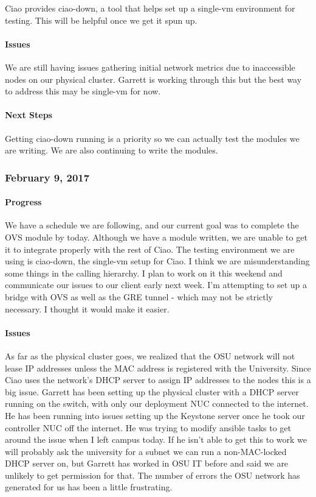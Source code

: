 \documentclass[10pt,onecolumn,journal,draftclsnofoot]{IEEEtran}
\begin{document}
Ciao provides ciao-down, a tool that helps set up a single-vm
environment for testing. This will be helpful once we get it spun up.

\paragraph{Issues} 

We are still having issues gathering initial network metrics due to
inaccessible nodes on our physical cluster. Garrett is working through
this but the best way to address this may be single-vm for now.

\paragraph{Next Steps} 

Getting ciao-down running is a priority so we can actually test the
modules we are writing. We are also continuing to write the modules.

\subsubsection{February 9, 2017} 

\paragraph{Progress} 

We have a schedule we are following, and our current goal was to
complete the OVS module by today. Although we have a module written, we
are unable to get it to integrate properly with the rest of Ciao. The
testing environment we are using is ciao-down, the single-vm setup for
Ciao. I think we are misunderstanding some things in the calling
hierarchy. I plan to work on it this weekend and communicate our issues
to our client early next week. I'm attempting to set up a bridge with
OVS as well as the GRE tunnel - which may not be strictly necessary. I
thought it would make it easier.

\paragraph{Issues} 

As far as the physical cluster goes, we realized that the OSU network
will not lease IP addresses unless the MAC address is registered with
the University. Since Ciao uses the network's DHCP server to assign IP
addresses to the nodes this is a big issue. Garrett has been setting up
the physical cluster with a DHCP server running on the switch, with only
our deployment NUC connected to the internet. He has been running into
issues setting up the Keystone server once he took our controller NUC
off the internet. He was trying to modify ansible tasks to get around
the issue when I left campus today. If he isn't able to get this to work
we will probably ask the university for a subnet we can run a
non-MAC-locked DHCP server on, but Garrett has worked in OSU IT before
and said we are unlikely to get permission for that. The number of
errors the OSU network has generated for us has been a little
frustrating.
\end{document}
